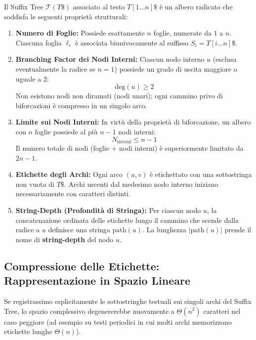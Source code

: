 \begin{definition}
Il Suffix Tree $\mathcal{T}(T\$)$ associato al testo $T[1 \dots n]\$$ \`e un albero radicato che soddisfa le seguenti propriet\`a strutturali:
\begin{enumerate}
  \item \textbf{Numero di Foglie:} Possiede esattamente $n$ foglie, numerate da $1$ a $n$. Ciascuna foglia $\ell_i$ \`e associata biunivocamente al suffisso $S_i = T[i \dots n]\$$.
  \item \textbf{Branching Factor dei Nodi Interni:} Ciascun nodo interno $u$ (esclusa eventualmente la radice se $n=1$) possiede un grado di uscita maggiore o uguale a 2:
  \begin{equation}
    \text{deg}(u) \ge 2
  \end{equation}
  Non esistono nodi non diramati (nodi unari); ogni cammino privo di biforcazioni \`e compresso in un singolo arco.
  \item \textbf{Limite sui Nodi Interni:} In virt\`u della propriet\`a di biforcazione, un albero con $n$ foglie possiede al pi\`u $n - 1$ nodi interni:
  \begin{equation}
    N_{\text{interni}} \le n - 1
  \end{equation}
  Il numero totale di nodi (foglie $+$ nodi interni) \`e superiormente limitato da $2n - 1$.
  \item \textbf{Etichette degli Archi:} Ogni arco $(u, v)$ \`e etichettato con una sottostringa non vuota di $T\$$. Archi uscenti dal medesimo nodo interno iniziano necessariamente con caratteri distinti.
  \item \textbf{String-Depth (Profondit\`a di Stringa):} Per ciascun nodo $u$, la concatenazione ordinata delle etichette lungo il cammino che scende dalla radice a $u$ definisce una stringa $\text{path}(u)$. La lunghezza $|\text{path}(u)|$ prende il nome di \textbf{string-depth} del nodo $u$.
\end{enumerate}
\end{definition}

\FloatBarrier
\subsection{Compressione delle Etichette: Rappresentazione in Spazio Lineare}
\label{subsec:compressione-etichette-suffix-tree}

Se registrassimo esplicitamente le sottostringhe testuali sui singoli archi del Suffix Tree, lo spazio complessivo degenererebbe nuovamente a $\Theta(n^2)$ caratteri nel caso peggiore (ad esempio su testi periodici in cui molti archi memorizzano etichette lunghe $\Theta(n)$).

